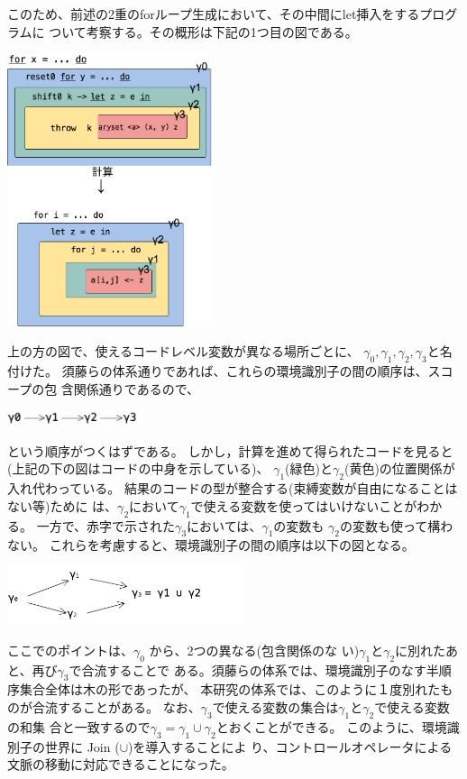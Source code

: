 このため、前述の2重のforループ生成において、その中間にlet挿入をするプログラムに
ついて考察する。その概形は下記の1つ目の図である。
\begin{center}
  \includegraphics[clip,height=8cm]{./img/ecex_for_non_gamma.png}
\end{center}
上の方の図で、使えるコードレベル変数が異なる場所ごとに、
$\gamma_0,\gamma_1,\gamma_2,\gamma_3$と名付けた。
須藤らの体系通りであれば、これらの環境識別子の間の順序は、スコープの包
含関係通りであるので、
\begin{center}
  \includegraphics[clip,width=4cm]{./img/gamma_normal.png}
\end{center}
という順序がつくはずである。
しかし，計算を進めて得られたコードを見ると(上記の下の図はコードの中身を示している)、
$\gamma_1$(緑色)と$\gamma_2$(黄色)の位置関係が入れ代わっている。
結果のコードの型が整合する(束縛変数が自由になることはない等)ために
は、$\gamma_2$において$\gamma_1$で使える変数を使ってはいけないことがわかる。
一方で、赤字で示された$\gamma_3$においては、$\gamma_1$の変数も
$\gamma_2$の変数も使って構わない。
これらを考慮すると、環境識別子の間の順序は以下の図となる。
\begin{center}
  \includegraphics[clip,width=7cm]{./img/gamma.png}
\end{center}
ここでのポイントは、$\gamma_0$ から、2つの異なる(包含関係のな
い)$\gamma_1$と$\gamma_2$に別れたあと、再び$\gamma_3$で合流することで
ある。須藤らの体系では、環境識別子のなす半順序集合全体は木の形であったが、
本研究の体系では、このように１度別れたものが合流することがある。
なお、$\gamma_3$で使える変数の集合は$\gamma_1$と$\gamma_2$で使える変数の和集
合と一致するので$\gamma_3 = \gamma_1 \cup \gamma_2$とおくことができる。
このように、環境識別子の世界に Join ($\cup$)を導入することによ
り、コントロールオペレータによる文脈の移動に対応できることになった。

